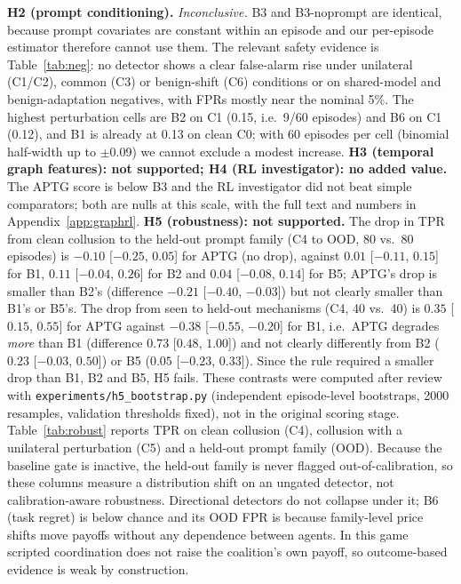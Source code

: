\documentclass[11pt]{article}
\begin{document}
\begin{table}[t]\centering\small\resizebox{\linewidth}{!}{}\caption{TPR at the validation-tuned 5\%-FPR threshold by mechanism (test). $^\dagger$Held out of all fits.}\label{tab:mech}\end{table}
\textbf{H2 (prompt conditioning).} \emph{Inconclusive.} B3 and B3-noprompt are identical, because prompt covariates are constant within an episode and our per-episode estimator therefore cannot use them. The relevant safety evidence is Table~\ref{tab:neg}: no detector shows a clear false-alarm rise under unilateral (C1/C2), common (C3) or benign-shift (C6) conditions or on shared-model and benign-adaptation negatives, with FPRs mostly near the nominal 5\%. The highest perturbation cells are B2 on C1 (0.15, i.e.\ 9/60 episodes) and B6 on C1 (0.12), and B1 is already at 0.13 on clean C0; with 60 episodes per cell (binomial half-width up to $\pm$0.09) we cannot exclude a modest increase.
\textbf{H3 (temporal graph features): not supported; H4 (RL investigator): no added value.} The APTG score is below B3 and the RL investigator did not beat simple comparators; both are nulls at this scale, with the full text and numbers in Appendix~\ref{app:graphrl}.
\textbf{H5 (robustness): not supported.} The drop in TPR from clean collusion to the held-out prompt family (C4 to OOD, 80 vs.\ 80 episodes) is $-0.10$ [$-0.25$, $0.05$] for APTG (no drop), against $0.01$ [$-0.11$, $0.15$] for B1, $0.11$ [$-0.04$, $0.26$] for B2 and $0.04$ [$-0.08$, $0.14$] for B5; APTG's drop is smaller than B2's (difference $-0.21$ [$-0.40$, $-0.03$]) but not clearly smaller than B1's or B5's. The drop from seen to held-out mechanisms (C4, 40 vs.\ 40) is $0.35$ [$0.15$, $0.55$] for APTG against $-0.38$ [$-0.55$, $-0.20$] for B1, i.e.\ APTG degrades \emph{more} than B1 (difference $0.73$ [$0.48$, $1.00$]) and not clearly differently from B2 ($0.23$ [$-0.03$, $0.50$]) or B5 ($0.05$ [$-0.23$, $0.33$]). Since the rule required a smaller drop than B1, B2 and B5, H5 fails. These contrasts were computed after review with \texttt{experiments/h5\_bootstrap.py} (independent episode-level bootstraps, 2000 resamples, validation thresholds fixed), not in the original scoring stage. Table~\ref{tab:robust} reports TPR on clean collusion (C4), collusion with a unilateral perturbation (C5) and a held-out prompt family (OOD). Because the baseline gate is inactive, the held-out family is never flagged out-of-calibration, so these columns measure a distribution shift on an ungated detector, not calibration-aware robustness. Directional detectors do not collapse under it; B6 (task regret) is below chance and its OOD FPR is \fproodBsix{} because family-level price shifts move payoffs without any dependence between agents. In this game scripted coordination does not raise the coalition's own payoff, so outcome-based evidence is weak by construction.
\end{document}
